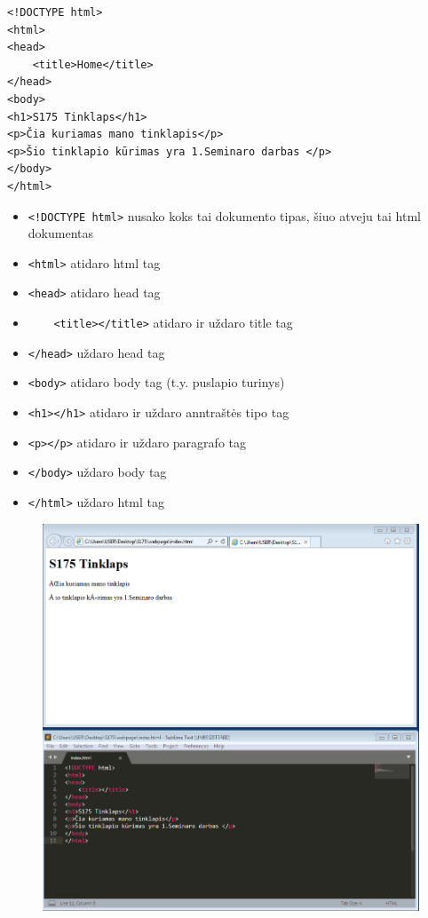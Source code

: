 \documentclass[12pt,a4paper]{article}
\begin{document}
\begin{enumerate}
\begin{lstlisting}
<!DOCTYPE html>
<html>
<head>
	<title>Home</title>
</head>
<body>
<h1>S175 Tinklaps</h1>
<p>Čia kuriamas mano tinklapis</p>
<p>Šio tinklapio kūrimas yra 1.Seminaro darbas </p>
</body>
</html>
\end{lstlisting}

\begin{itemize}
\item \colorbox{listinggray}{\lstinline|<!DOCTYPE html>|} nusako koks tai dokumento tipas, šiuo atveju tai html dokumentas
\item \colorbox{listinggray}{\lstinline|<html>|} atidaro html tag
\item \colorbox{listinggray}{\lstinline|<head>|} atidaro head tag
\item \colorbox{listinggray}{\lstinline|	<title></title>|} atidaro ir uždaro title tag
\item \colorbox{listinggray}{\lstinline|</head>|} uždaro head  tag
\item \colorbox{listinggray}{\lstinline|<body>|} atidaro body tag (t.y. puslapio turinys)
\item \colorbox{listinggray}{\lstinline|<h1></h1>|} atidaro ir uždaro anntraštės tipo tag
\item \colorbox{listinggray}{\lstinline|<p></p>|} atidaro ir uždaro paragrafo tag
\item \colorbox{listinggray}{\lstinline|</body>|} uždaro body tag
\item \colorbox{listinggray}{\lstinline|</html>|} uždaro html tag
\end{itemize}


\begin{figure}[H]
\center
\includegraphics[scale=0.4]{webpage_5.png}
\end{figure}


\end{enumerate}
\end{document}
